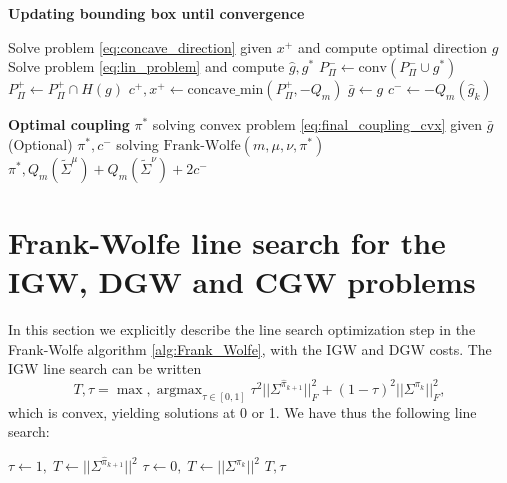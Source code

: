 \documentclass{article}
\newcommand{\1}{\mathbf{1}}
\newcommand{\DGW}{\mathrm{DGW}}
\newcommand{\IGW}{\mathrm{IGW}}
\DeclareMathOperator*{\argmax}{argmax}
\theoremstyle{definition}
\theoremstyle{remark}
\begin{document}
\begin{appendices}
\begin{algorithm}
\begin{algorithmic}[1]
 \State  \textbf{Updating bounding box until convergence }

    \State Solve problem  \eqref{eq:concave_direction} given $x^+$ and compute optimal direction $g$ 
    \State Solve problem \eqref{eq:lin_problem} and compute $\hat{g},g^*$ 
    \State $P_\Pi^-\gets \mathrm{conv} (P_\Pi^-\cup g^*)$  
    \State $P_\Pi^+\gets P_\Pi^+\cap H(g)$ 
    \State $c^+,x^+\gets \mathrm{concave\_min}(P_\Pi^+, -Q_m)$ 
    \State $\bar{g}\gets g$
    \State $c^-\gets -Q_m(\hat{g}_{ k})$
    \EndIf
\EndWhile


\State  \textbf{Optimal coupling} $\pi^*$ solving convex problem \eqref{eq:final_coupling_cvx} given $\bar{g}$
\State (Optional) $\pi^*, c^-$ solving $\text{Frank-Wolfe}(m,\mu,\nu,\pi^*)$
\State\Return $\pi^*,Q_m(\tilde{\Sigma}^{\mu})+Q_m(\tilde{\Sigma}^{\nu})+2c^-$
\end{algorithmic}
\end{algorithm}


\newpage




\clearpage
\section{Frank-Wolfe line search for the IGW, DGW and CGW problems}\label{sec:supp_line_search}
In this section we explicitly describe the line search optimization step in the Frank-Wolfe algorithm \ref{alg:Frank_Wolfe}, with the $\IGW$ and $\DGW$ costs. The $\IGW$ line search can be written  \[T, \tau=\max,\argmax_{\tau\in[0,1]} \tau^2||\Sigma^{\hat{\pi}_{k+1}}||^2_F+(1-\tau)^2||\Sigma^{\pi_k}||^2_F,\] which is convex, yielding solutions at 0 or 1. We have thus the following line search:

\begin{algorithm}
\caption{Line search for IGW}\label{alg:line_IGW}
\begin{algorithmic}[1]
\State $\tau\gets 1, \;T\gets ||\Sigma^{\hat{\pi}_{k+1}}||^2$
\Else
\State $\tau\gets 0,\; T\gets ||\Sigma^{\pi_{k}}||^2$
\EndIf
\State\Return $T,\tau$
\end{algorithmic}
\end{algorithm}



\end{appendices}
\end{document}

